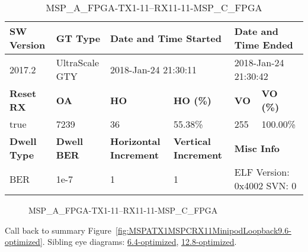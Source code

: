 \begin{table}[h]
\centering
\caption{MSP\_A\_FPGA-TX1-11--RX11-11-MSP\_C\_FPGA}
\label{tab:MSPAFPGATX111RX1111MSPCFPGA9.6-optimized}
\begin{tabular}{@{}|l|l|l|l|l|l|@{}}
\toprule
\textbf{SW Version}                & \textbf{GT Type}   & \multicolumn{2}{l|}{\textbf{Date and Time Started}}            & \multicolumn{2}{l|}{\textbf{Date and Time Ended}}        \\ \midrule
2017.2                       & UltraScale GTY          & \multicolumn{2}{l|}{2018-Jan-24 21:30:11}                   & \multicolumn{2}{l|}{2018-Jan-24 21:30:42}               \\ \midrule
\textbf{Reset RX}                  & \textbf{OA} & \textbf{HO}   & \textbf{HO (\%)} & \textbf{VO} & \textbf{VO (\%)} \\ \midrule
true & 7239        & 36          & 55.38\%        & 255        & 100.00\%       \\ \midrule
\textbf{Dwell Type}                & \textbf{Dwell BER} & \textbf{Horizontal Increment} & \textbf{Vertical Increment}    & \multicolumn{2}{l|}{\textbf{Misc Info}}                  \\ \midrule
BER                            & 1e-7        & 1        & 1           & \multicolumn{2}{l|}{ELF Version: 0x4002 SVN: 0}                         \\ \bottomrule
\end{tabular}
\end{table}

\begin{figure}[h]
\caption{MSP\_A\_FPGA-TX1-11--RX11-11-MSP\_C\_FPGA} \label{fig:MSPAFPGATX111RX1111MSPCFPGA9.6-optimized}
\end{figure}

Call back to summary Figure~\ref{fig:MSPATX1MSPCRX11MinipodLoopback9.6-optimized}.
Sibling eye diagrams: \hyperref[sec:MSPAFPGATX111RX1111MSPCFPGA6.4-optimized]{6.4-optimized}, \hyperref[sec:MSPAFPGATX111RX1111MSPCFPGA12.8-optimized]{12.8-optimized}.

\clearpage
\newpage

